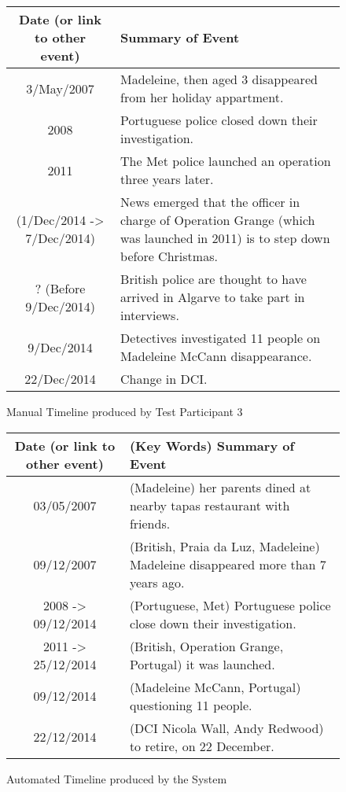 \begin{figure}[H]
\begin{tabular}{|c|p{7cm}|}
\hline
Date (or link to other event) & Summary of Event\\
\hline
\hline
3/May/2007 & Madeleine, then aged 3 disappeared from her holiday appartment.\\
\hline
2008 & Portuguese police closed down their investigation.\\
\hline
2011 & The Met police launched an operation three years later.\\
\hline
(1/Dec/2014 -> 7/Dec/2014) & News emerged that the officer in charge of Operation Grange (which was launched in 2011) is to step down before Christmas.\\
\hline
? (Before 9/Dec/2014) & British police are thought to have arrived in Algarve to take part in interviews.\\
\hline
9/Dec/2014 & Detectives investigated 11 people on Madeleine McCann disappearance.\\
\hline
22/Dec/2014 & Change in DCI.\\
\hline
\end{tabular}
\caption{Manual Timeline produced by Test Participant 3}
\end{figure}

\begin{figure}[H]
\begin{tabular}{|c|p{7cm}|}
\hline
Date (or link to other event) & (Key Words) Summary of Event\\
\hline
\hline
03/05/2007 & (Madeleine) her parents dined at nearby tapas restaurant with friends.\\
\hline
09/12/2007 & (British, Praia da Luz, Madeleine) Madeleine disappeared more than 7 years ago.\\
\hline
2008 -> 09/12/2014 & (Portuguese, Met) Portuguese police close down their investigation.\\
\hline
2011 -> 25/12/2014 & (British, Operation Grange, Portugal) it was launched.\\
\hline
09/12/2014 & (Madeleine McCann, Portugal) questioning 11 people.\\
\hline
22/12/2014 & (DCI Nicola Wall, Andy Redwood) to retire, on 22 December.\\
\hline
\end{tabular}
\caption{Automated Timeline produced by the System}
\end{figure}



